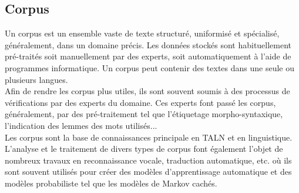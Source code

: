 \documentclass{report}
\begin{document}
    \subsection{Corpus}
    Un corpus est un ensemble vaste de texte structuré, uniformisé et spécialisé, généralement, dans un domaine précis.
    Les données stockés sont habituellement pré-traités soit manuellement par des experts, soit automatiquement à l'aide de programmes informatique. Un corpus peut contenir des textes dans une seule ou plusieurs langues.\\ 
    Afin de rendre les corpus plus utiles, ils sont souvent soumis à des processus de vérifications par des experts du domaine. Ces experts font passé les corpus, généralement, par des pré-traitement tel que l'étiquetage morpho-syntaxique, l'indication des lemmes des mots utilisés...\\
    Les corpus sont la base de connaissances principale en TALN et en linguistique. L'analyse et le traitement de divers types de corpus font également l'objet de nombreux travaux en reconnaissance vocale, traduction automatique, etc. où ils sont souvent utilisés pour créer des modèles d'apprentissage automatique et des modèles probabiliste tel que les modèles de Markov cachés.\\
\end{document}
